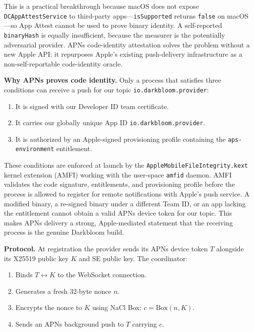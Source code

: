 \documentclass[10pt,twocolumn,letterpaper]{article}
\begin{document}
This is a practical breakthrough because macOS does not expose \texttt{DCAppAttestService} to third-party apps---\texttt{isSupported} returns \texttt{false} on macOS---so App Attest cannot be used to prove binary identity. A self-reported \texttt{binaryHash} is equally insufficient, because the measurer is the potentially adversarial provider. APNs code-identity attestation solves the problem without a new Apple API: it repurposes Apple's existing push-delivery infrastructure as a non-self-reportable code-identity oracle.

\textbf{Why APNs proves code identity.} Only a process that satisfies three conditions can receive a push for our topic \texttt{io.darkbloom.provider}:
\begin{enumerate}[leftmargin=*,itemsep=1pt]
    \item It is signed with our Developer ID team certificate.
    \item It carries our globally unique App ID \texttt{io.darkbloom.provider}.
    \item It is authorized by an Apple-signed provisioning profile containing the \texttt{aps-environment} entitlement.
\end{enumerate}
These conditions are enforced at launch by the \texttt{AppleMobileFileIntegrity.kext} kernel extension (AMFI) working with the user-space \texttt{amfid} daemon. AMFI validates the code signature, entitlements, and provisioning profile before the process is allowed to register for remote notifications with Apple's push service. A modified binary, a re-signed binary under a different Team ID, or an app lacking the entitlement cannot obtain a valid APNs device token for our topic. This makes APNs delivery a strong, Apple-mediated statement that the receiving process is the genuine Darkbloom build.

\textbf{Protocol.} At registration the provider sends its APNs device token $T$ alongside its X25519 public key $K$ and SE public key. The coordinator:
\begin{enumerate}[leftmargin=*,itemsep=1pt]
    \item Binds $T \leftrightarrow K$ to the WebSocket connection.
    \item Generates a fresh 32-byte nonce $n$.
    \item Encrypts the nonce to $K$ using NaCl Box: $c = \text{Box}(n, K)$.
    \item Sends an APNs background push to $T$ carrying $c$.
\end{enumerate}
\end{document}
